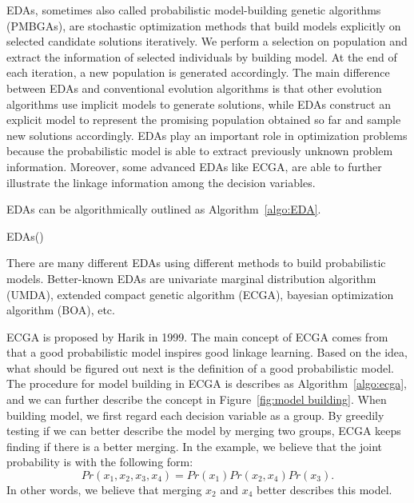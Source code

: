EDAs, sometimes also called probabilistic model-building genetic algorithms
(PMBGAs), are stochastic optimization methods that build models
explicitly on selected candidate solutions iteratively.
We perform a selection on population and extract the information of
selected individuals by building model.
At the end of each iteration, a new population is generated accordingly.
The main difference between EDAs and conventional evolution algorithms
is that other evolution algorithms use implicit models to generate
solutions, while EDAs construct an explicit model to represent the
promising population obtained so far and sample new solutions
accordingly.
EDAs play an important role in optimization problems because the
probabilistic model is able to extract previously unknown problem
information.  Moreover, some advanced EDAs like ECGA, are able to
further illustrate the linkage information among the decision variables.

EDAs can be algorithmically outlined as Algorithm~\ref{algo:EDA}.


\begin{algorithm}

   \caption {EDAs()}
  \label{algo:EDA} 
 \end{algorithm}

There are many different EDAs using different methods to build
probabilistic models.  Better-known EDAs are univariate marginal
distribution algorithm (UMDA), extended compact genetic algorithm
(ECGA), bayesian optimization algorithm (BOA), etc.

ECGA is proposed by Harik in 1999.
The main concept of ECGA comes from that a good probabilistic model
inspires good linkage learning.
Based on the idea, what should be figured out next is the definition of
a good probabilistic model.
The procedure for model building in ECGA is describes as
Algorithm~\ref{algo:ecga}, and we can further describe the concept in
Figure~\ref{fig:model building}.
When building model, we first regard each decision variable as a group.
By greedily testing if we can better describe the model by merging two
groups, ECGA keeps finding if there is a better merging.
In the example, we believe that the joint probability is with the
following form:
\[Pr(x_1,x_2,x_3,x_4) = Pr(x_1)Pr(x_2,x_4)Pr(x_3).\]
In other words, we believe that merging $x_2$ and $x_4$ better describes
this model.

